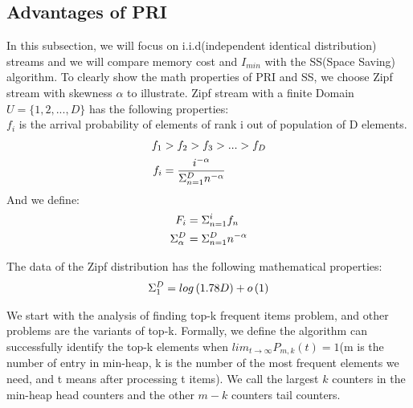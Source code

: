 {\color{reviewC}
\presub
\subsection{Advantages of PRI}
\postsub

In this subsection, we will focus on i.i.d(independent identical distribution) streams and we will compare memory cost and $I_{min}$ with the SS(Space Saving) algorithm.
To clearly show the math properties of PRI and SS, we choose Zipf stream with skewness $\alpha$ to illustrate. Zipf stream with a finite Domain $U = \{1, 2, ..., D\}$ has the following properties:\\

$f_i$ is the arrival probability of elements of rank i out of population of D elements.
\begin{equation}
\begin{aligned}
\centering  
f_1 &> f_2 > f_3 > ... > f_D \\ 
f_i &= \frac{i^{-\alpha}}{\Sigma_{n=1}^D{n^{-\alpha}}}
\end{aligned}
\end{equation}
And we define:
\begin{equation}
\begin{aligned}
\centering  
F_i &= \Sigma_{n=1}^i{f_n}\\
\Sigma_\alpha^D &= \Sigma_{n=1}^D{n^{-\alpha}}
\end{aligned}
\end{equation}

The data of the Zipf distribution has the following mathematical properties:\\
\begin{equation}
\begin{aligned}
\centering
    \label{equ:2}
    \Sigma_1^D &= log\left(1.78D\right) + o\left(1\right)\\
\end{aligned}
\end{equation}

We start with the analysis of finding top-k frequent items problem, and other problems are the variants of top-k. 
Formally, we define the algorithm can successfully identify the top-k elements when $lim_{t\to\infty} P_{m, k}(t) = 1$(m is the number of entry in min-heap, k is the number of the most frequent elements we need, and t means after processing t items). 
We call the largest $k$ counters in the min-heap head counters and the other $m-k$ counters tail counters.

}

